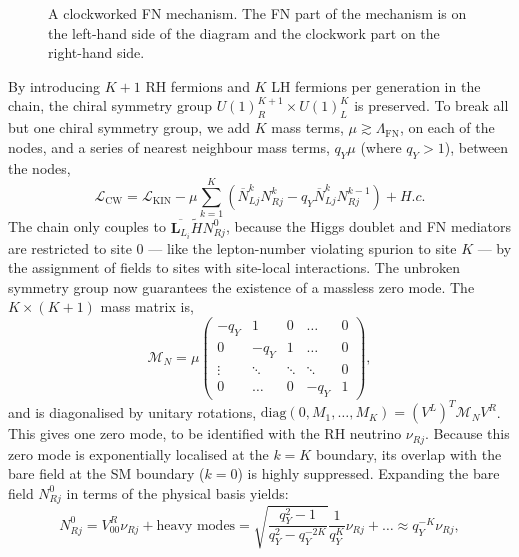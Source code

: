 \documentclass[11pt,letterpaper]{article}
\begin{document}
\begin{figure}[h!]
    \caption{A clockworked FN mechanism. The FN part of the mechanism is on
      the left-hand side of the diagram and the clockwork part on the
      right-hand side.}
    \label{fig:CW with FN}
\end{figure}
By introducing $K+1$ RH fermions and $K$ LH fermions per generation in the chain, the chiral symmetry group $U(1)_R^{K+1}\times U(1)_L^K$ is preserved. To break all but one chiral symmetry group, we add $K$ mass terms, $\mu \gtrsim \Lambda_{\text{FN}}$, on each of the nodes, and a series of nearest neighbour mass terms, $q_Y\mu$ (where $q_Y>1$), between the nodes,
\begin{equation}
    \mathcal{L}_{\text{CW}} = \mathcal{L}_{\text{KIN}} - \mu \sum_{k=1}^{K} (\overline N_{Lj}^{k}  N_{Rj}^{k} - q_Y \overline N_{L j}^{k}  N_{Rj}^{k-1}) + H.c.
\end{equation}
The chain only couples to $\overline{\bm{L}_{L_i}} \tilde H N_{R j }^0$,
because the Higgs doublet and FN mediators are restricted to site 0 --- like
the lepton-number violating spurion to site $K$ --- by the assignment of
fields to sites with site-local interactions. The unbroken symmetry group now
guarantees the existence of a massless zero mode. The $K\times(K+1)$ mass
matrix is, 
\begin{equation}
    \mathcal{M}_N = \mu 
    \begin{pmatrix}
        -q_Y & 1 & 0 & \dots & 0 \\
        0 & -q_Y & 1 & \dots & 0 \\
        \vdots & \ddots & \ddots & \ddots & 0 \\
        0 & \dots & 0 & -q_Y & 1
    \end{pmatrix},
\end{equation}
and is diagonalised by unitary rotations, $\text{diag}(0,M_1,\dots,M_K) = (V^L)^T\mathcal{M}_N V^R$. This gives one zero mode, to be identified with the RH neutrino $\nu_{R j}$. Because this zero mode is exponentially localised at the $k=K$ boundary, its overlap with the bare field at the SM boundary ($k=0$) is highly suppressed. Expanding the bare field $N_{Rj}^0$ in terms of the physical basis yields:
\begin{equation}
    N_{R j}^0 = V_{00}^R \nu_{R j} + \text{heavy modes} = \sqrt{\frac{q_Y^2-1}{q_Y^{2} - q_Y^{-2K}}}\frac{1}{q_Y^K} \nu_{R j} + \dots \approx q_Y^{-K} \nu_{R j},
\end{equation}
\end{document}

